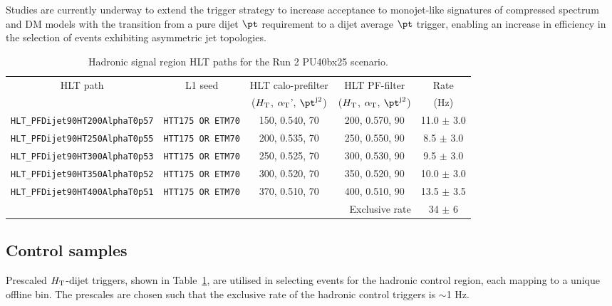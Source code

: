 Studies are currently underway to extend the trigger strategy to increase acceptance to monojet-like signatures of compressed spectrum and DM models with the transition from a pure dijet $\pt$ requirement to a dijet average $\pt$ trigger, enabling an increase in efficiency in the selection of events exhibiting asymmetric jet topologies.


\begin{table}[h!]
\footnotesize
\centering
\begin{tabular}{|c||c|c|c||c|} 
\hline
HLT path & L1 seed & HLT calo-prefilter                      & HLT PF-filter                          & Rate \\[0.7 ex] 
         &         & ($\mbox{$H_\text{T}$}$, $\alpha_{\text{T}}$', $\pt^{\rm j2}$) & ($\mbox{$H_\text{T}$}$, $\alpha_{\text{T}}$, $\pt^{\rm j2}$) & (Hz) \\[0.7 ex] 
\hline
\verb!HLT_PFDijet90HT200AlphaT0p57! & \verb!HTT175 OR ETM70! & 150, 0.540, 70 & 200, 0.570, 90 & 11.0 $\pm$ 3.0 \\
\verb!HLT_PFDijet90HT250AlphaT0p55! & \verb!HTT175 OR ETM70! & 200, 0.535, 70 & 250, 0.550, 90 & 8.5  $\pm$ 3.0 \\
\verb!HLT_PFDijet90HT300AlphaT0p53! & \verb!HTT175 OR ETM70! & 250, 0.525, 70 & 300, 0.530, 90 & 9.5  $\pm$ 3.0 \\
\verb!HLT_PFDijet90HT350AlphaT0p52! & \verb!HTT175 OR ETM70! & 300, 0.520, 70 & 350, 0.520, 90 & 10.0 $\pm$ 3.0 \\
\verb!HLT_PFDijet90HT400AlphaT0p51! & \verb!HTT175 OR ETM70! & 370, 0.510, 70 & 400, 0.510, 90 & 13.5 $\pm$ 3.5 \\
\hline
\multicolumn{4}{|r||}{Exclusive rate} & 34 $\pm$ 6 \\
\hline


\end{tabular}
\caption{Hadronic signal region HLT paths for the Run 2 PU40bx25 scenario. }
\label{tab:2015_Hadronic_Signal_Triggers}
\end{table}




\subsection{Control samples}
Prescaled $\mbox{$H_\text{T}$}$-dijet triggers, shown in Table~\ref{tab:2015_Hadronic_Signal_Triggers}, are utilised in selecting events for the hadronic control region, each mapping to a unique offline bin. The prescales are chosen such that the exclusive rate of the hadronic control triggers is $\sim$1 Hz.

